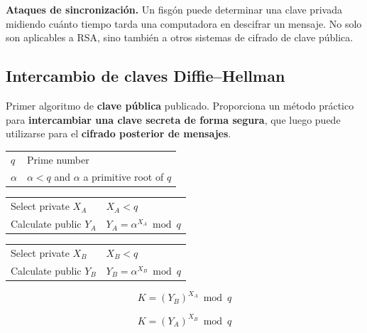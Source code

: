 \documentclass[11pt,a4paper]{article}
\begin{document}
\begin{NotaBox}
\textbf{Ataques de sincronización.} Un fisgón puede determinar una clave privada midiendo cuánto tiempo tarda una computadora en descifrar un mensaje. No solo son aplicables a RSA, sino también a otros sistemas de cifrado de clave pública.
\end{NotaBox}

\subsection{Intercambio de claves Diffie--Hellman}

Primer algoritmo de \textbf{clave pública} publicado.
Proporciona un método práctico para \textbf{intercambiar una clave secreta de forma segura}, que luego puede utilizarse para el \textbf{cifrado posterior de mensajes}.

\begin{tcolorbox}[colback=gray!15,colframe=black,title=\textbf{Global Public Elements}]
\begin{tabular}{ll}
$q$ & Prime number \\
$\alpha$ & $\alpha < q$ and $\alpha$ a primitive root of $q$
\end{tabular}
\end{tcolorbox}

\begin{tcolorbox}[colback=gray!15,colframe=black,title=\textbf{User A Key Generation}]
\begin{tabular}{ll}
Select private $X_A$ & $X_A < q$ \\
Calculate public $Y_A$ & $Y_A = \alpha^{X_A} \bmod q$
\end{tabular}
\end{tcolorbox}

\begin{tcolorbox}[colback=gray!15,colframe=black,title=\textbf{User B Key Generation}]
\begin{tabular}{ll}
Select private $X_B$ & $X_B < q$ \\
Calculate public $Y_B$ & $Y_B = \alpha^{X_B} \bmod q$
\end{tabular}
\end{tcolorbox}

\begin{tcolorbox}[colback=gray!05,colframe=black,title=\textbf{Generation of Secret Key by User A}]
\[
K = (Y_B)^{X_A} \bmod q
\]
\end{tcolorbox}

\begin{tcolorbox}[colback=gray!05,colframe=black,title=\textbf{Generation of Secret Key by User B}]
\[
K = (Y_A)^{X_B} \bmod q
\]
\end{tcolorbox}
\end{document}
